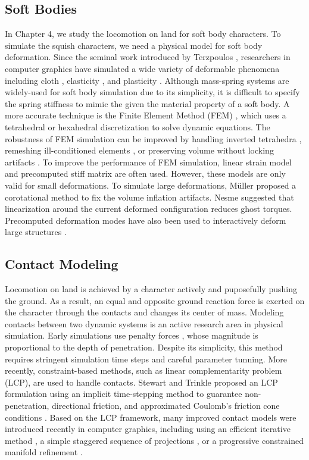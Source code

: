 \subsection{Soft Bodies}
In Chapter 4, we study the locomotion on land for soft body characters. To simulate the squish characters, we need a physical model for soft body deformation.
Since the seminal work introduced by Terzpoulos
\cite{Terzopoulos:1987}, researchers in computer graphics have
simulated a wide variety of deformable phenomena including cloth
\cite{Baraff:1998,Bridson:2002}, elasticity \cite{Muller:2002}, and
plasticity \cite{O'Brien:1999,Bargteil:2007}. Although mass-spring systems \cite{Provot:1996,Liu:2013} are
widely-used for soft body simulation due to its simplicity, it is difficult to
specify the spring stiffness to mimic the given the material property of a soft body. A more accurate technique is
the Finite Element Method (FEM) \cite{Bathe:2007}, which uses a
tetrahedral or hexahedral discretization to solve dynamic
equations. The robustness of FEM simulation can be improved by
handling inverted tetrahedra \cite{Irving:2004}, remeshing
ill-conditioned elements \cite{Bargteil:2007}, or preserving volume
without locking artifacts \cite{Irving:2007}. To improve the
performance of FEM simulation, linear strain model and precomputed
stiff matrix are often used. However, these models are only valid for
small deformations. To simulate large deformations, M\"{u}ller \etal
\cite{Muller:2002} proposed a corotational method to fix the
volume inflation artifacts. Nesme \etal \cite{NPF05} suggested
that linearization around the current deformed configuration reduces
ghost torques. Precomputed deformation modes have also been used to
interactively deform large structures
\cite{James:2003,Barbic:2005,Kim:2009}.

\subsection{Contact Modeling}
Locomotion on land is achieved by a character actively and puposefully pushing the ground. As a result, an equal and opposite ground reaction force is exerted on the character through the contacts and changes its center of mass. Modeling contacts between two dynamic systems is an active research area in physical simulation. Early simulations use penalty forces \cite{Terzopoulos:1987}, whose magnitude is proportional to the depth of penetration. Despite its simplicity, this method requires stringent simulation time steps and careful parameter tunning. More recently, constraint-based methods, such as linear complementarity problem (LCP), are used to handle contacts. Stewart and Trinkle proposed an
LCP formulation using an implicit time-stepping method to guarantee
non-penetration, directional friction, and approximated Coulomb's
friction cone conditions \cite{Stewart:1996}. Based on the LCP
framework, many improved contact models were introduced recently in
computer graphics, including using an efficient iterative method
\cite{Erleben:2007}, a simple staggered sequence of projections
\cite{Kaufman:2008}, or a progressive constrained manifold
refinement \cite{Otaduy:2009}. 

